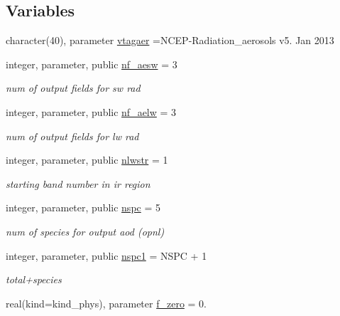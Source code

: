 \subsection*{Variables}
\begin{DoxyCompactItemize}
\item 
character(40), parameter \hyperlink{namespacemodule__radiation__aerosols_a6d0e0cbcb4a13c1f80f6b1c41b13d3b8}{vtagaer} =\textquotesingle{}N\+C\+EP-\/Radiation\+\_\+aerosols v5. Jan 2013 \textquotesingle{}
\item 
integer, parameter, public \hyperlink{namespacemodule__radiation__aerosols_ae0d9615fa694e2a5dfe8fb48e99b7e76}{nf\+\_\+aesw} = 3
\begin{DoxyCompactList}\small\item\em num of output fields for sw rad \end{DoxyCompactList}\item 
integer, parameter, public \hyperlink{namespacemodule__radiation__aerosols_afba0069cd611248a9595a126a13f5203}{nf\+\_\+aelw} = 3
\begin{DoxyCompactList}\small\item\em num of output fields for lw rad \end{DoxyCompactList}\item 
integer, parameter, public \hyperlink{namespacemodule__radiation__aerosols_a654ab60d433133542d3c07edd2244566}{nlwstr} = 1
\begin{DoxyCompactList}\small\item\em starting band number in ir region \end{DoxyCompactList}\item 
integer, parameter, public \hyperlink{namespacemodule__radiation__aerosols_a3d126c465af80bb698d9d1a288c181bb}{nspc} = 5
\begin{DoxyCompactList}\small\item\em num of species for output aod (opnl) \end{DoxyCompactList}\item 
integer, parameter, public \hyperlink{namespacemodule__radiation__aerosols_a476c0181513603112dec3f4d2a2ec839}{nspc1} = N\+S\+PC + 1
\begin{DoxyCompactList}\small\item\em total+species \end{DoxyCompactList}\item 
real(kind=kind\+\_\+phys), parameter \hyperlink{namespacemodule__radiation__aerosols_a7db1adcf476a9a5532230aa11fcc3bb7}{f\+\_\+zero} = 0.

\end{DoxyCompactItemize}
